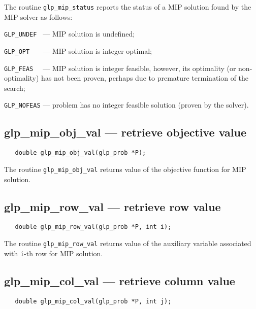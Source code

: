 \returns

The routine \verb|glp_mip_status| reports the status of a MIP solution
found by the MIP solver as follows:

\verb|GLP_UNDEF | --- MIP solution is undefined;

\verb|GLP_OPT   | --- MIP solution is integer optimal;

\verb|GLP_FEAS  | --- MIP solution is integer feasible, however, its
optimality (or non-optimality) has not been proven, perhaps due to
premature termination of the search;

\verb|GLP_NOFEAS| --- problem has no integer feasible solution (proven
by the solver).

\subsection{glp\_mip\_obj\_val --- retrieve objective value}

\synopsis

\begin{verbatim}
   double glp_mip_obj_val(glp_prob *P);
\end{verbatim}

\returns

The routine \verb|glp_mip_obj_val| returns value of the objective
function for MIP solution.

\subsection{glp\_mip\_row\_val --- retrieve row value}

\synopsis

\begin{verbatim}
   double glp_mip_row_val(glp_prob *P, int i);
\end{verbatim}

\returns

The routine \verb|glp_mip_row_val| returns value of the auxiliary
variable associated with \verb|i|-th row for MIP solution.

\subsection{glp\_mip\_col\_val --- retrieve column value}

\synopsis

\begin{verbatim}
   double glp_mip_col_val(glp_prob *P, int j);
\end{verbatim}

